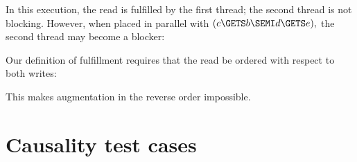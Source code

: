 In this execution, the read is fulfilled by the first thread; the second
thread is not blocking.  However, when placed in parallel with
\begin{math}
  (c\GETS b\SEMI d\GETS e),
\end{math}
the second thread may become a blocker:
\begin{tikzdisplay}[node distance=1em]
\end{tikzdisplay}

Our definition of fulfillment requires that the read be ordered with respect
to both writes:
\begin{tikzdisplay}[node distance=1em]
\end{tikzdisplay}
This makes augmentation in the reverse order impossible.



\section{Causality test cases}
\label{sec:examples}

